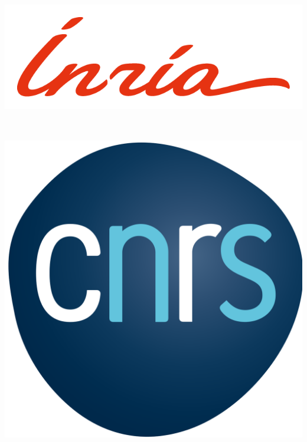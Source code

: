 \documentclass[11pt, a4paper]{article}
\begin{document}
\begin{gridlayout}{\textwidth}{5cm}
    \begin{row}{0.5}
        \begin{cell}{0.25}
            \centering
            \includegraphics[width=\cellwidth, height=\rowheight, keepaspectratio]{img/logo-inria.png}
        \end{cell}
        \begin{cell}{0.125}
            ~ %
        \end{cell}
        \begin{cell}{0.25}
            \centering
            \includegraphics[width=\cellwidth, height=\rowheight, keepaspectratio]{img/logo-cnrs.png}
        \end{cell}
        \begin{cell}{0.125}
            ~ %
        \end{cell}

\end{row}
\end{gridlayout}
\end{document}
